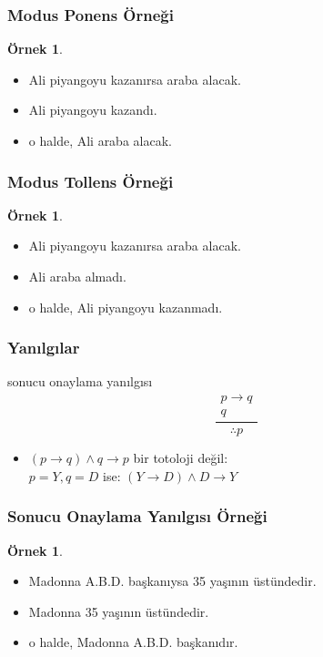 \documentclass[dvipsnames]{beamer}
\theoremstyle{definition}
\theoremstyle{example}
\newtheorem{ornek}[theorem]{Örnek}
\theoremstyle{plain}
\begin{document}
\begin{frame}
  \frametitle{Modus Ponens Örneği}

  \begin{ornek}
    \begin{itemize}
      \item Ali piyangoyu kazanırsa araba alacak.
      \item Ali piyangoyu kazandı.

      \pause
      \medskip
      \item o halde, Ali araba alacak.
    \end{itemize}
  \end{ornek}
\end{frame}

\begin{frame}
  \frametitle{Modus Tollens Örneği}

  \begin{ornek}
    \begin{itemize}
      \item Ali piyangoyu kazanırsa araba alacak.
      \item Ali araba almadı.

      \pause
      \medskip
      \item o halde, Ali piyangoyu kazanmadı.
    \end{itemize}
  \end{ornek}
\end{frame}

\begin{frame}
  \frametitle{Yanılgılar}

  \begin{block}{sonucu onaylama yanılgısı}
    \[
    \frac
      {
      \begin{array}{c}
        p \rightarrow q\\
        q
        \end{array}
      }
      {
        \therefore p
      }
    \]
  \end{block}

  \pause
  \begin{itemize}
    \item $(p \rightarrow q) \wedge q \rightarrow p$ bir totoloji değil:\\
      $p=Y,q=D$ ise: $(Y \rightarrow D) \wedge D \rightarrow Y$
  \end{itemize}
\end{frame}

\begin{frame}
  \frametitle{Sonucu Onaylama Yanılgısı Örneği}

  \begin{ornek}
    \begin{itemize}
      \item Madonna A.B.D. başkanıysa 35 yaşının üstündedir.
      \item Madonna 35 yaşının üstündedir.

      \pause
      \medskip
      \item o halde, Madonna A.B.D. başkanıdır.
    \end{itemize}
  \end{ornek}
\end{frame}
\end{document}
